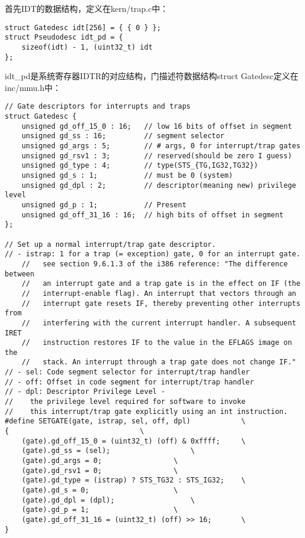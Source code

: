 \documentclass{article}
\begin{document}
\begin{CJK*}{UTF8}{gkai}
首先IDT的数据结构，定义在kern/trap.c中：

\begin{lstlisting}[style=ccode, title={\scriptsize \ttfamily \bfseries kern/trap.c}]
struct Gatedesc idt[256] = { { 0 } };
struct Pseudodesc idt_pd = {
	sizeof(idt) - 1, (uint32_t) idt
};
\end{lstlisting}

idt\_pd是系统寄存器IDTR的对应结构，门描述符数据结构struct Gatedesc定义在inc/mmu.h中：

\begin{lstlisting}[style=ccode, firstnumber=257, title={\scriptsize \ttfamily \bfseries inc/mmu.h}]
// Gate descriptors for interrupts and traps
struct Gatedesc {
	unsigned gd_off_15_0 : 16;   // low 16 bits of offset in segment
	unsigned gd_ss : 16;         // segment selector
	unsigned gd_args : 5;        // # args, 0 for interrupt/trap gates
	unsigned gd_rsv1 : 3;        // reserved(should be zero I guess)
	unsigned gd_type : 4;        // type(STS_{TG,IG32,TG32})
	unsigned gd_s : 1;           // must be 0 (system)
	unsigned gd_dpl : 2;         // descriptor(meaning new) privilege level
	unsigned gd_p : 1;           // Present
	unsigned gd_off_31_16 : 16;  // high bits of offset in segment
};

// Set up a normal interrupt/trap gate descriptor.
// - istrap: 1 for a trap (= exception) gate, 0 for an interrupt gate.
    //   see section 9.6.1.3 of the i386 reference: "The difference between
    //   an interrupt gate and a trap gate is in the effect on IF (the
    //   interrupt-enable flag). An interrupt that vectors through an
    //   interrupt gate resets IF, thereby preventing other interrupts from
    //   interfering with the current interrupt handler. A subsequent IRET
    //   instruction restores IF to the value in the EFLAGS image on the
    //   stack. An interrupt through a trap gate does not change IF."
// - sel: Code segment selector for interrupt/trap handler
// - off: Offset in code segment for interrupt/trap handler
// - dpl: Descriptor Privilege Level -
//	  the privilege level required for software to invoke
//	  this interrupt/trap gate explicitly using an int instruction.
#define SETGATE(gate, istrap, sel, off, dpl)			\
{								\
	(gate).gd_off_15_0 = (uint32_t) (off) & 0xffff;		\
	(gate).gd_ss = (sel);					\
	(gate).gd_args = 0;					\
	(gate).gd_rsv1 = 0;					\
	(gate).gd_type = (istrap) ? STS_TG32 : STS_IG32;	\
	(gate).gd_s = 0;					\
	(gate).gd_dpl = (dpl);					\
	(gate).gd_p = 1;					\
	(gate).gd_off_31_16 = (uint32_t) (off) >> 16;		\
}
\end{lstlisting}


\end{CJK*}
\end{document}
